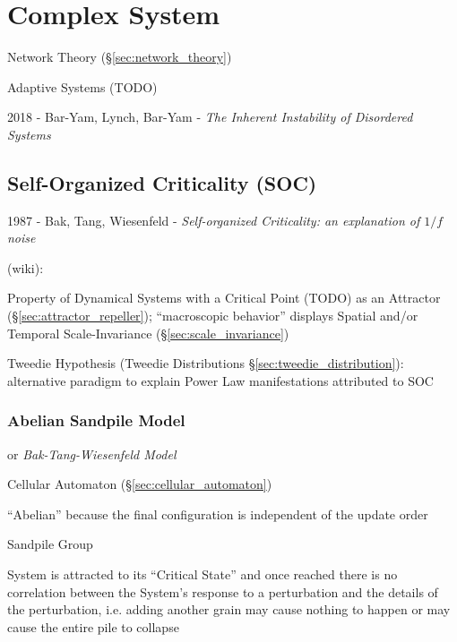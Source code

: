 \section{Complex System}\label{sec:complex_system}

Network Theory (\S\ref{sec:network_theory})

Adaptive Systems (TODO)

2018 - Bar-Yam, Lynch, Bar-Yam - \emph{The Inherent Instability of Disordered
  Systems}



\subsection{Self-Organized Criticality (SOC)}\label{sec:soc}

1987 - Bak, Tang, Wiesenfeld - \emph{Self-organized Criticality: an explanation
  of $1/f$ noise}

(wiki):

Property of Dynamical Systems with a Critical Point (TODO) as an Attractor
(\S\ref{sec:attractor_repeller}); ``macroscopic behavior'' displays Spatial
and/or Temporal Scale-Invariance (\S\ref{sec:scale_invariance})

\fist Tweedie Hypothesis (Tweedie Distributions
\S\ref{sec:tweedie_distribution}): alternative paradigm to explain Power Law
manifestations attributed to SOC



\subsubsection{Abelian Sandpile Model}\label{sec:abelian_sandpile}

or \emph{Bak-Tang-Wiesenfeld Model}

Cellular Automaton (\S\ref{sec:cellular_automaton})

``Abelian'' because the final configuration is independent of the update order

Sandpile Group

System is attracted to its ``Critical State'' and once reached there is no
correlation between the System's response to a perturbation and the details of
the perturbation, i.e. adding another grain may cause nothing to happen or may
cause the entire pile to collapse

